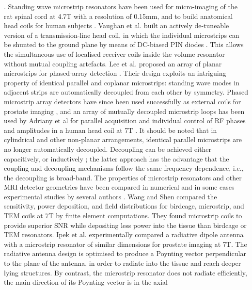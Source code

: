 \cite{Zhang:2003ju}. Standing wave microstrip resonators have been used for
micro-imaging of the rat spinal cord at 4.7T with a resolution of
0.15mm, and to build anatomical head coils for human subjects
\cite{Driesel:2008di}. Vaughan et al. built an actively de-tuneable version
of a transmission-line head coil, in which the individual microstrips
can be shunted to the ground plane by means of DC-biased PIN diodes
\cite{Vaughan:2002cs}. This allows the simultaneous use of localised
receiver coils inside the volume resonator without mutual coupling
artefacts. Lee et al. proposed an array of planar microstrips
\cite{Lee:2001ji,Boskamp2006tl} for phased-array detection
\cite{Roemer:1990gs,Hoult:2004gm}. Their design exploits an intriguing
property of identical parallel and coplanar microstrips: standing wave
modes in adjacent strips are automatically decoupled from each other by
symmetry. Phased microstrip array detectors have since been used
successfully as external coils for prostate imaging
\cite{vandenBergen:2010hg}, and an array of mutually decoupled microstrip
loops has been used by Adriany et al for parallel acquisition and
individual control of RF phases and amplitudes in a human head coil at
7T \cite{Adriany:2005cw}. It should be noted that in cylindrical and other
non-planar arrangements, identical parallel microstrips are no longer
automatically decoupled. Decoupling can be achieved either capacitively,
or inductively \cite{Wu:2006bs}; the latter approach has the advantage that
the coupling and decoupling mechanisms follow the same frequency
dependence, i.e., the decoupling is broad-band. The properties of
microstrip resonators and other MRI detector geometries have been
compared in numerical and in some cases experimental studies by several
authors \cite{Wang:2006gk,vandenBergen:2009dk,Ipek:2012bm}. Wang and Shen
\cite{Wang:2006gk} compared the sensitivity, power deposition, and field
distributions for birdcage, microstrip, and TEM coils at 7T by finite
element computations. They found microstrip coils to provide superior
SNR while depositing less power into the tissue than birdcage or TEM
resonators. Ipek et al. \cite{Ipek:2012bm} experimentally compared a
radiative dipole antenna with a microstrip resonator of similar
dimensions for prostate imaging at 7T. The radiative antenna design is
optimised to produce a Poynting vector perpendicular to the plane of the
antenna, in order to radiate into the tissue and reach deeper lying
structures. By contrast, the microstrip resonator does not radiate
efficiently, the main direction of its Poynting vector is in the axial
